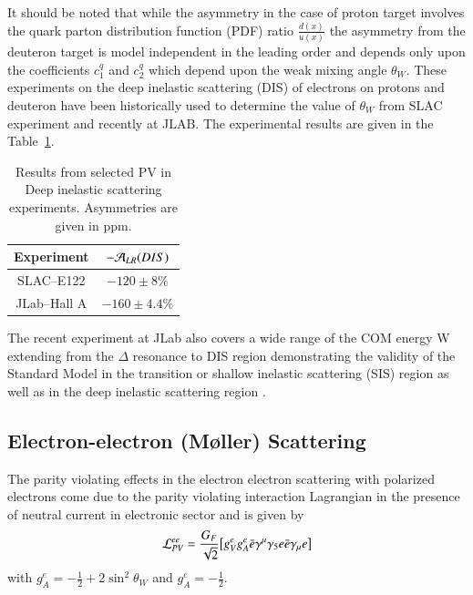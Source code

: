 It should be noted that while the asymmetry in the case of proton target involves the quark  parton distribution function (PDF) ratio $\frac{d(x)}{u(x)}$ the asymmetry from the deuteron target is  model independent in the leading order and depends only upon the coefficients $c_1^q$ and $c_2^q$ which depend upon the weak mixing angle $\theta_W$. These experiments on the deep inelastic scattering (DIS) of electrons on protons and deuteron have been historically used to determine the value of $\theta_W$ from SLAC experiment and recently at JLAB. The experimental results are given in the Table~\ref{chap9-tab5}. \smallskip
\begin{table}
\centering
\renewcommand{\arraystretch}{1.2}
\begin{tabular}{|c|c|} 
\hline
Experiment & $-{\cal A}_{LR}(DIS)$ \\ 
\hline
SLAC--E122&$-120\pm8\%$\\
\hline
JLab--Hall A&$-160\pm 4.4\%$ \\
\hline
\end{tabular}
\caption{Results from selected PV in Deep inelastic scattering experiments. Asymmetries are given in ppm.}\label{chap9-tab5}
\end{table}


The recent experiment at JLab also covers a wide range of the COM energy W extending from the $\Delta$ resonance to DIS region demonstrating the validity of the Standard Model in the transition or shallow inelastic scattering (SIS) region as well as in the deep inelastic scattering region \cite{chap9-key28}.
    
\subsection{Electron-electron (M\o ller) Scattering}\label{chap9-subsec3.4}

The parity violating effects in the electron electron scattering with polarized electrons come due to the parity violating interaction Lagrangian in the presence of neutral current in electronic sector and is given by 
\begin{equation}
{\cal L}_{PV}^{ee}= \frac{G_F}{\sqrt{2}}\big[g_V^eg_A^e  \bar{e} \gamma^\mu \gamma_5 e\bar{e}\gamma_\mu e\big] \label{chap9-eq35}
\end{equation}
 with $g_A^e =-\frac{1}{2}+2\sin^2\theta_W$ and $g_A^e=-\frac{1}{2}$.
 
